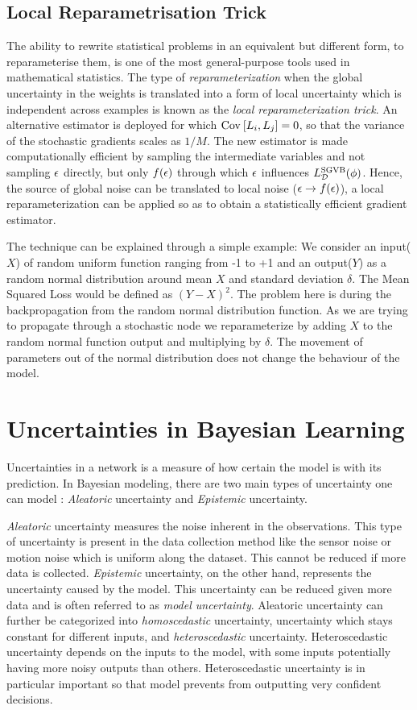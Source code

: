 \subsection{Local  Reparametrisation  Trick}
The ability to rewrite statistical problems in an equivalent but different form, to reparameterise them, is one of the most general-purpose tools used in mathematical statistics. The type of \textit{reparameterization} when the global uncertainty in the weights is translated into a form of local uncertainty which is independent across examples is known as the \emph{local reparameterization trick}. 
An alternative estimator is deployed for which $\text{Cov}_{}\left[L_{i},L_{j}\right] = 0$, so that the variance of the stochastic gradients scales as $1/M$.
The new estimator is made computationally efficient by sampling the intermediate variables and not sampling $\mathbf{\epsilon}$ directly, but only  $f(\mathbf{\epsilon})$ through which $\mathbf{\epsilon}$ influences $L_{\mathcal{D}}^\text{SGVB}(\mathbf{\phi})$. Hence, the source of global noise can be translated to local noise ($\mathbf{\epsilon} \rightarrow f(\mathbf{\epsilon})$), a local reparameterization can be applied so as to obtain a statistically efficient gradient estimator.

The technique can be explained through a simple example: We consider an input($X$) of random uniform function ranging from -1 to +1 and an output($Y$) as a random normal distribution around mean $X$ and standard deviation $\delta$. The Mean Squared Loss would be defined as 
$(Y-X)^2$. The problem here is during the backpropagation from the random normal distribution function. As we are trying to propagate through a stochastic node we reparameterize by adding $X$ to the random normal function output and multiplying by $\delta$.
The movement of parameters out of the normal distribution does not change the behaviour of the model. 


\section{Uncertainties in Bayesian Learning}


Uncertainties in a network is a measure of how certain the model is with its prediction. In Bayesian modeling, there are two main types of uncertainty one can model \citep{Kiureghian}: \textit{Aleatoric} uncertainty and \textit{Epistemic} uncertainty. 

\textit{Aleatoric} uncertainty measures the noise inherent in the observations. This type of uncertainty is present in the data collection method like the sensor noise or motion noise which is uniform along the dataset. This cannot be reduced if more data is collected. \textit{Epistemic} uncertainty, on the other hand, represents the uncertainty caused by the model. This uncertainty can be reduced given more data and is often referred to as \textit{model uncertainty}.  Aleatoric uncertainty can further be categorized into \textit{homoscedastic} uncertainty, uncertainty which stays constant for different inputs, and \textit{heteroscedastic} uncertainty. Heteroscedastic uncertainty depends on the inputs to the model, with some inputs potentially having more noisy outputs than others. Heteroscedastic uncertainty is in particular important so that model prevents from outputting very confident decisions.

